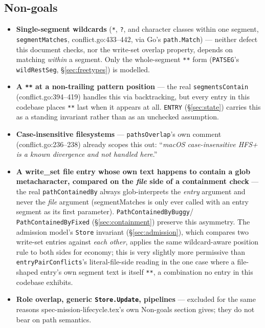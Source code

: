 \documentclass[a4paper,10pt,fleqn]{article}
\newcommand{\field}[1]{\texttt{#1}}
\begin{document}
\subsection{Non-goals}
\label{sec:nongoals}

\begin{itemize}
  \item \textbf{Single-segment wildcards} (\texttt{*}, \texttt{?},
    and character classes within one segment,
    \field{segmentMatches}, conflict.go:433--442, via Go's
    \field{path.Match}) --- neither defect this document checks, nor
    the write-set overlap property, depends on matching \emph{within}
    a segment. Only the whole-segment \texttt{**} form
    (\field{PATSEG}'s \field{wildRestSeg}, \S\ref{sec:freetypes})
    is modelled.
  \item \textbf{A \texttt{**} at a non-trailing pattern position} ---
    the real \field{segmentsContain} (conflict.go:394--419) handles
    this via backtracking, but every entry in this codebase places
    \texttt{**} last when it appears at all. \field{ENTRY}
    (\S\ref{sec:state}) carries this as a standing invariant rather
    than as an unchecked assumption.
  \item \textbf{Case-insensitive filesystems} --- \field{pathsOverlap}'s
    own comment (conflict.go:236--238) already scopes this out:
    ``\emph{macOS case-insensitive HFS+ is a known divergence and not
    handled here}.''
  \item \textbf{A write\_set file entry whose own text happens to
    contain a glob metacharacter, compared on the \emph{file} side of
    a containment check} --- the real \field{pathContainedBy} always
    glob-interprets the \emph{entry} argument and never the
    \emph{file} argument (segmentMatches is only ever called with an
    entry segment as its first parameter). \field{PathContainedByBuggy}/
    \field{PathContainedByFixed} (\S\ref{sec:containment}) preserve
    this asymmetry. The admission model's \field{Store} invariant
    (\S\ref{sec:admission}), which compares two write-set entries
    against \emph{each other}, applies the same wildcard-aware
    position rule to both sides for economy; this is very slightly
    more permissive than \field{entryPairConflicts}'s literal-file-side
    reading in the one case where a file-shaped entry's own segment
    text is itself \texttt{**}, a combination no entry in this
    codebase exhibits.
  \item \textbf{Role overlap, generic \field{Store.Update}, pipelines} ---
    excluded for the same reasons spec-mission-lifecycle.tex's own
    Non-goals section gives; they do not bear on path semantics.
\end{itemize}
\end{document}
